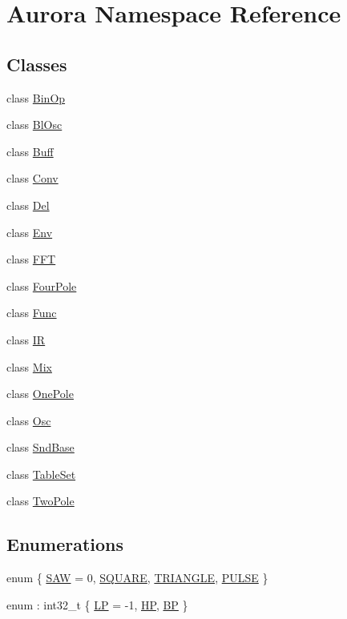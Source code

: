 \hypertarget{namespace_aurora}{}\section{Aurora Namespace Reference}
\label{namespace_aurora}
\subsection*{Classes}
\begin{DoxyCompactItemize}
\item 
class \hyperlink{class_aurora_1_1_bin_op}{Bin\+Op}
\item 
class \hyperlink{class_aurora_1_1_bl_osc}{Bl\+Osc}
\item 
class \hyperlink{class_aurora_1_1_buff}{Buff}
\item 
class \hyperlink{class_aurora_1_1_conv}{Conv}
\item 
class \hyperlink{class_aurora_1_1_del}{Del}
\item 
class \hyperlink{class_aurora_1_1_env}{Env}
\item 
class \hyperlink{class_aurora_1_1_f_f_t}{F\+FT}
\item 
class \hyperlink{class_aurora_1_1_four_pole}{Four\+Pole}
\item 
class \hyperlink{class_aurora_1_1_func}{Func}
\item 
class \hyperlink{class_aurora_1_1_i_r}{IR}
\item 
class \hyperlink{class_aurora_1_1_mix}{Mix}
\item 
class \hyperlink{class_aurora_1_1_one_pole}{One\+Pole}
\item 
class \hyperlink{class_aurora_1_1_osc}{Osc}
\item 
class \hyperlink{class_aurora_1_1_snd_base}{Snd\+Base}
\item 
class \hyperlink{class_aurora_1_1_table_set}{Table\+Set}
\item 
class \hyperlink{class_aurora_1_1_two_pole}{Two\+Pole}
\end{DoxyCompactItemize}
\subsection*{Enumerations}
\begin{DoxyCompactItemize}
\item 
enum \{ \hyperlink{namespace_aurora_a890b8d3786c8a25750e8097adae3b513ad47a607309b6d737bba699a295e5e814}{S\+AW} = 0, 
\hyperlink{namespace_aurora_a890b8d3786c8a25750e8097adae3b513ad12f117b00f964cb4de3809ca2e2fa2b}{S\+Q\+U\+A\+RE}, 
\hyperlink{namespace_aurora_a890b8d3786c8a25750e8097adae3b513a0c9e1e4fb03cbc79bb5fdd9db743818f}{T\+R\+I\+A\+N\+G\+LE}, 
\hyperlink{namespace_aurora_a890b8d3786c8a25750e8097adae3b513aa52ebfb9f31c0d7f0da3f2f66b622928}{P\+U\+L\+SE}
 \}
\item 
enum \+: int32\+\_\+t \{ \hyperlink{namespace_aurora_a963f359f40fdbc5f4dbe4043534de9ebaa9f81f17c7244e2198dba962e817cf89}{LP} = -\/1, 
\hyperlink{namespace_aurora_a963f359f40fdbc5f4dbe4043534de9eba404a7e9d666dc8dc6a9492163a8f3d49}{HP}, 
\hyperlink{namespace_aurora_a963f359f40fdbc5f4dbe4043534de9ebae818fb1792095c52b12163ec152896c8}{BP}
 \}
\end{DoxyCompactItemize}
